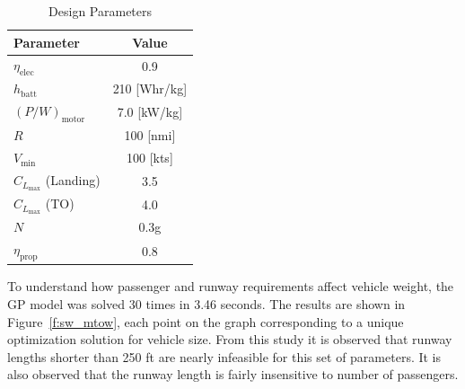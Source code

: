\documentclass[]{aiaa-tc}%
\begin{document}
\begin{table}[H]
    \centering
    \caption{Design Parameters}
    \label{t:params}
    \begin{tabular}{l c}
    \toprule
    \toprule
    Parameter                                   & Value         \\ \hline
    $\eta_{\mathrm{elec}}$                      & 0.9           \\
    $h_{\mathrm{batt}}$                         & 210 [Whr/kg]  \\
    $(P/W)_{\mathrm{motor}}$                         & 7.0 [kW/kg] \\
    $R$                                         & 100 [nmi]     \\
    $V_{\mathrm{min}}$                          & 100 [kts]     \\
    $C_{L_{\mathrm{max}}}$ (Landing)            & 3.5           \\
    $C_{L_{\mathrm{max}}}$ (TO)                 & 4.0           \\
    $N$                                         & 0.3g          \\
    $\eta_{\mathrm{prop}}$                      & 0.8           \\
    \bottomrule
\end{tabular}
\end{table}

To understand how passenger and runway requirements affect vehicle weight, the GP model was solved 30 times in 3.46 seconds.  
The results are shown in Figure~\ref{f:sw_mtow}, each point on the graph corresponding to a unique optimization solution for vehicle size.  
From this study it is observed that runway lengths shorter than 250 ft are nearly infeasible for this set of parameters.  
It is also observed that the runway length is fairly insensitive to number of passengers.  
\end{document}

